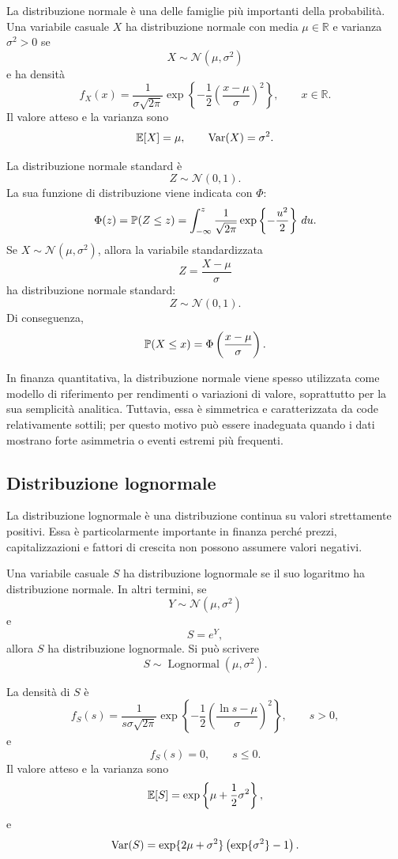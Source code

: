 La distribuzione normale \`{e} una delle famiglie pi\`{u} importanti della
probabilit\`{a}. Una variabile casuale $X$ ha distribuzione normale con media
$\mu\in\mathbb{R}$ e varianza $\sigma^2>0$ se
\[
X\sim \mathcal{N}(\mu,\sigma^2)
\]
e ha densit\`{a}
\[
f_X(x)
=
\frac{1}{\sigma\sqrt{2\pi}}
\exp\left\{
-\frac{1}{2}\left(\frac{x-\mu}{\sigma}\right)^2
\right\},
\qquad x\in\mathbb{R}.
\]
Il valore atteso e la varianza sono
\[
\mathbb{E}[X]=\mu,
\qquad
\operatorname{Var}(X)=\sigma^2.
\]

La distribuzione normale standard \`{e}
\[
Z\sim \mathcal{N}(0,1).
\]
La sua funzione di distribuzione viene indicata con $\Phi$:
\[
\Phi(z)
=
\mathbb{P}(Z\leq z)
=
\int_{-\infty}^{z}
\frac{1}{\sqrt{2\pi}}
\exp\left\{-\frac{u^2}{2}\right\}\,du.
\]
Se $X\sim \mathcal{N}(\mu,\sigma^2)$, allora la variabile standardizzata
\[
Z=\frac{X-\mu}{\sigma}
\]
ha distribuzione normale standard:
\[
Z\sim \mathcal{N}(0,1).
\]
Di conseguenza,
\[
\mathbb{P}(X\leq x)
=
\Phi\left(\frac{x-\mu}{\sigma}\right).
\]

In finanza quantitativa, la distribuzione normale viene spesso utilizzata come
modello di riferimento per rendimenti o variazioni di valore, soprattutto per la
sua semplicit\`{a} analitica. Tuttavia, essa \`{e} simmetrica e caratterizzata da
code relativamente sottili; per questo motivo pu\`{o} essere inadeguata quando
i dati mostrano forte asimmetria o eventi estremi pi\`{u} frequenti.

\subsection{Distribuzione lognormale}

La distribuzione lognormale \`{e} una distribuzione continua su valori
strettamente positivi. Essa \`{e} particolarmente importante in finanza perch\'{e}
prezzi, capitalizzazioni e fattori di crescita non possono assumere valori
negativi.

Una variabile casuale $S$ ha distribuzione lognormale se il suo logaritmo ha
distribuzione normale. In altri termini, se
\[
Y\sim \mathcal{N}(\mu,\sigma^2)
\]
e
\[
S=e^Y,
\]
allora $S$ ha distribuzione lognormale. Si pu\`{o} scrivere
\[
S\sim \operatorname{Lognormal}(\mu,\sigma^2).
\]

La densit\`{a} di $S$ \`{e}
\[
f_S(s)
=
\frac{1}{s\sigma\sqrt{2\pi}}
\exp\left\{
-\frac{1}{2}\left(\frac{\ln s-\mu}{\sigma}\right)^2
\right\},
\qquad s>0,
\]
e
\[
f_S(s)=0,
\qquad s\leq 0.
\]
Il valore atteso e la varianza sono
\[
\mathbb{E}[S]
=
\exp\left\{\mu+\frac{1}{2}\sigma^2\right\},
\]
e
\[
\operatorname{Var}(S)
=
\exp\{2\mu+\sigma^2\}
\left(\exp\{\sigma^2\}-1\right).
\]


